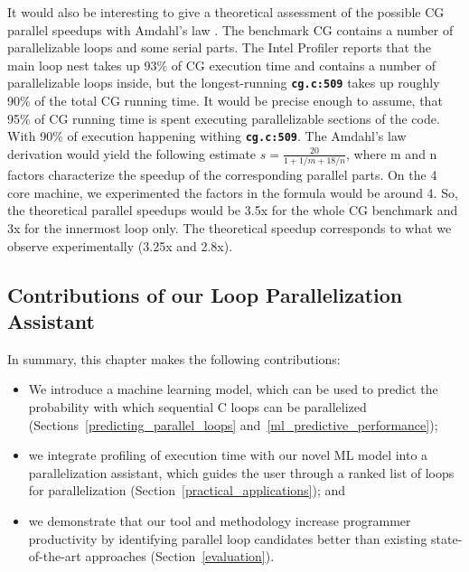 It would also be interesting to give a theoretical assessment of the possible CG parallel speedups with Amdahl's law \cite{10.1145/1465482.1465560}. The benchmark CG contains a number of parallelizable loops and some serial parts. The Intel Profiler reports that the main loop nest takes up 93\% of CG execution time and contains a number of parallelizable loops inside, but the longest-running \textbf{\texttt{cg.c:509}} takes up roughly 90\% of the total CG running time. It would be precise enough to assume, that 95\% of CG running time is spent executing parallelizable sections of the code. With 90\% of execution happening withing \textbf{\texttt{cg.c:509}}. The Amdahl's law derivation would yield the following estimate $s=\frac{20}{1+1/m+18/n}$, where m and n factors characterize the speedup of the corresponding parallel parts. On the 4 core machine, we experimented the factors in the formula would be around 4. So, the theoretical parallel speedups would be 3.5x for the whole CG benchmark and 3x for the innermost loop only. The theoretical speedup corresponds to what we observe experimentally (3.25x and 2.8x).
\subsection{Contributions of our Loop Parallelization Assistant}
\quad In summary, this chapter makes the following contributions:
%
\begin{itemize}
\renewcommand\labelitemi{$\vartriangleright$}
\renewcommand\labelitemii{$\bullet$}
\item We introduce a machine learning model, which can be used to predict the probability with which sequential C loops can be parallelized (Sections~\ref{predicting_parallel_loops} and~\ref{ml_predictive_performance});
\item we integrate profiling of execution time with our novel ML model into a parallelization assistant, which guides the user through a ranked list of loops for parallelization (Section~\ref{practical_applications}); and
\item we demonstrate that our tool and methodology increase programmer productivity by identifying parallel loop candidates better than existing state-of-the-art approaches (Section~\ref{evaluation}).
\end{itemize}

